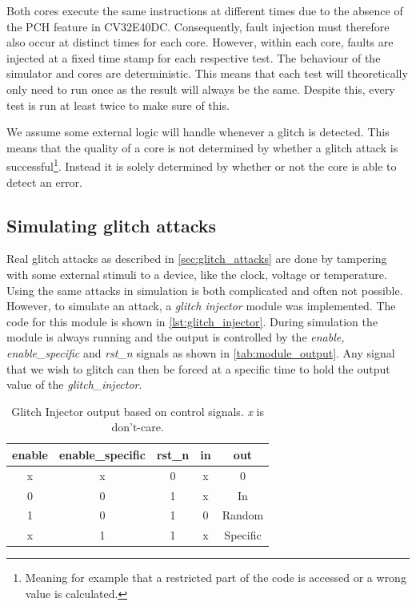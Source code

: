 Both cores execute the same instructions at different times due to the absence of the PCH feature in CV32E40DC. Consequently, fault injection must therefore also occur at distinct times for each core. However, within each core, faults are injected at a fixed time stamp for each respective test. The behaviour of the simulator and cores are deterministic. This means that each test will theoretically only need to run once as the result will always be the same. Despite this, every test is run at least twice to make sure of this.

We assume some external logic will handle whenever a glitch is detected. This means that the quality of a core is not determined by whether a glitch attack is successful\footnote{Meaning for example that a restricted part of the code is accessed or a wrong value is calculated.}. Instead it is solely determined by whether or not the core is able to detect an error. 

\subsection{Simulating glitch attacks}
\label{subsec:sim_glitch}

Real glitch attacks as described in \autoref{sec:glitch_attacks} are done by tampering with some external stimuli to a device, like the clock, voltage or temperature. Using the same attacks in simulation is both complicated and often not possible. However, to simulate an attack, a \textit{glitch injector} module was implemented. The code for this module is shown in \autoref{lst:glitch_injector}. During simulation the module is always running and the output is controlled by the \textit{enable, enable\_specific} and \textit{rst\_n} signals as shown in \autoref{tab:module_output}. Any signal that we wish to glitch can then be forced at a specific time to hold the output value of the \textit{glitch\_injector}.

\begin{table}[h]
\centering
\caption{Glitch Injector output based on control signals. \textit{x} is don't-care.}
\label{tab:module_output}
\begin{tabular}{ccccc}
\toprule 
\rowcolor{black!20} \textbf{enable} & \textbf{enable\_specific} & \textbf{rst\_n} & \textbf{in} & \textbf{out} \\
\midrule
x & x & 0 & x & 0 \\
\rowcolor{black!20}0 & 0 & 1 & x & In \\
1 & 0 & 1 & 0 & Random \\
\rowcolor{black!20} x & 1 & 1 & x & Specific \\
\bottomrule
\end{tabular}
\end{table}

